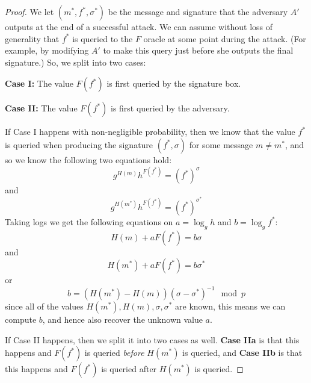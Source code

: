 \begin{proof}
We let \((m^*,f^*,\sigma^*)\) be the message and signature that the
adversary \(A'\) outputs at the end of a successful attack. We can
assume without loss of generality that \(f^*\) is queried to the \(F\)
oracle at some point during the attack. (For example, by modifying
\(A'\) to make this query just before she outputs the final signature.)
So, we split into two cases:

\textbf{Case I:} The value \(F(f^*)\) is first queried by the signature
box.

\textbf{Case II:} The value \(F(f^*)\) is first queried by the
adversary.

If Case I happens with non-negligible probability, then we know that the
value \(f^*\) is queried when producing the signature \((f^*,\sigma)\)
for some message \(m \neq m^*\), and so we know the following two
equations hold:
\begin{equation*}
 g^{H(m)}h^{F(f^*)} = (f^*)^{\sigma}
\end{equation*}
and
\begin{equation*}
 g^{H(m^*)}h^{F(f^*)}=  (f^*)^{\sigma^*}
\end{equation*}
Taking logs we get the following equations on \(a = \log_g h\) and
\(b=\log_g f^*\):
\begin{equation*}
H(m)+aF(f^*) = b\sigma
\end{equation*}
and
\begin{equation*}
H(m^*)+aF(f^*)=b\sigma^*
\end{equation*}
or
\begin{equation*}
b= (H(m^*)-H(m))(\sigma-\sigma^*)^{-1} \mod p
\end{equation*}
since all of the values \(H(m^*),H(m),\sigma,\sigma^*\) are known, this
means we can compute \(b\), and hence also recover the unknown value
\(a\).

If Case II happens, then we split it into two cases as well.
\textbf{Case IIa} is that this happens and \(F(f^*)\) is queried
\emph{before} \(H(m^*)\) is queried, and \textbf{Case IIb} is that this
happens and \(F(f^*)\) is queried after \(H(m^*)\) is queried.


\end{proof}

